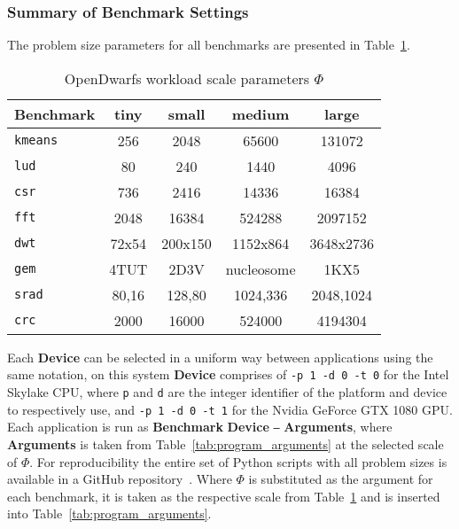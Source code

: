 \documentclass[../document.tex]{subfiles}
\begin{document}
\subsubsection{Summary of Benchmark Settings}

The problem size parameters for all benchmarks are presented in Table~\ref{tab:problem_sizes}.

\begin{table}[thb]
	\centering
	\begin{threeparttable}
		\centering
		\caption{OpenDwarfs workload scale parameters $\Phi$}
		\begin{tabular}{l|c|c|c|c}
			\bf Benchmark         & \bf tiny   & \bf small  & \bf medium     & \bf large\\\hline
			{\tt kmeans}          & 256        & 2048   & 65600      & 131072\\
			{\tt lud}             & 80         & 240    & 1440       & 4096\\
			{\tt csr}             & 736        & 2416   & 14336      & 16384\\
			{\tt fft}             & 2048       & 16384  & 524288     & 2097152\\
			{\tt dwt}             & 72x54      & 200x150& 1152x864   & 3648x2736\\       
			{\tt gem}             & 4TUT       & 2D3V   & nucleosome & 1KX5\\
			{\tt srad}            & 80,16      & 128,80 & 1024,336   & 2048,1024\\
			{\tt crc}             & 2000       & 16000  & 524000     & 4194304\\
		\end{tabular}
		\label{tab:problem_sizes}
	\end{threeparttable}
\end{table}

Each {\bf Device} can be selected in a uniform way between applications using the same notation, on this system {\bf Device} comprises of {\tt -p 1 -d 0 -t 0} for the Intel Skylake CPU, where {\tt p} and {\tt d} are the integer identifier of the platform and device to respectively use, and {\tt -p 1 -d 0 -t 1} for the Nvidia GeForce GTX 1080 GPU.
Each application is run as {\bf Benchmark} {\bf Device} {\tt --} {\bf Arguments}, where {\bf Arguments} is taken from Table~\ref{tab:program_arguments} at the selected scale of $\Phi$.
For reproducibility the entire set of Python scripts with all problem sizes is available in a GitHub repository~\cite{johnston2017}. 
Where $\Phi$ is substituted as the argument for each benchmark, it is taken as the respective scale from Table~\ref{tab:problem_sizes} and is inserted into Table~\ref{tab:program_arguments}.
\end{document}
